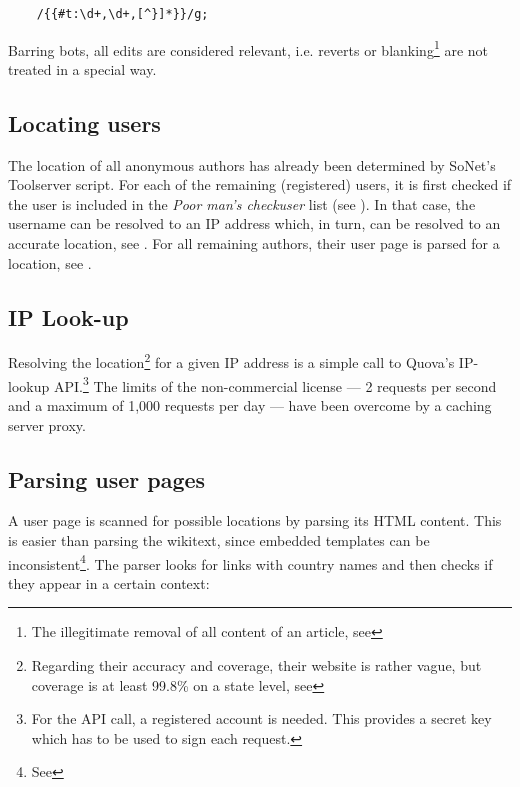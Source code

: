 \lstset{caption=,label=wikitrustre,language=HTML,numbers=none}
\begin{lstlisting}
	/{{#t:\d+,\d+,[^}]*}}/g;
\end{lstlisting}

Barring bots, all edits are considered relevant, i.e. reverts or blanking\footnote{The illegitimate removal of all content of an article, see } are not treated in a special way.


\subsection{Locating users}

The location of all anonymous authors has already been determined by SoNet's Toolserver script.
For each of the remaining (registered) users, it is first checked if the user is included in the \emph{Poor man's checkuser} list (see ).
In that case, the username can be resolved to an \ac{IP} address which, in turn, can be resolved to an accurate location, see .
For all remaining authors, their user page is parsed for a location, see .


\subsection{IP Look-up}\label{sub:iplookup}

Resolving the location\footnote{Regarding their accuracy and coverage, their website is rather vague, but coverage is at least 99.8\% on a state level, see } for a given \ac{IP} address is a simple call to Quova's IP-lookup \ac{API}.\footnote{For the \ac{API} call, a registered account is needed. This provides a secret key which has to be used to sign each request.}
The limits of the non-commercial license --- 2 requests per second and a maximum of 1,000 requests per day --- have been overcome by a caching server proxy.


\subsection{Parsing user pages}\label{sub:parsinguserpages}

A user page is scanned for possible locations by parsing its \ac{HTML} content.
This is easier than parsing the wikitext, since embedded templates can be inconsistent\footnote{See }.
The parser looks for links with country names and then checks if they appear in a certain context:

